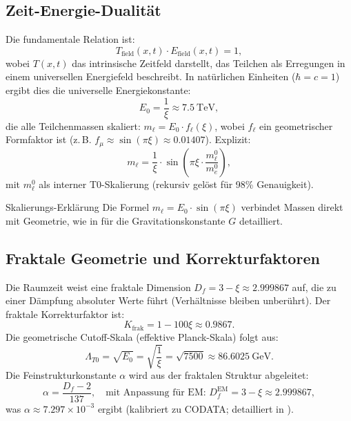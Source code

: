 \documentclass[12pt,a4paper]{article}
\begin{document}
	\subsection{Zeit-Energie-Dualität}
	Die fundamentale Relation ist:
	\begin{equation}
		T_\text{field}(x,t) \cdot E_\text{field}(x,t) = 1,
	\end{equation}
	wobei $T(x,t)$ das intrinsische Zeitfeld darstellt, das Teilchen als Erregungen in einem universellen Energiefeld beschreibt. In natürlichen Einheiten ($\hbar = c = 1$) ergibt dies die universelle Energiekonstante:
	\begin{equation}
		E_0 = \frac{1}{\xi} \approx \SI{7.5}{\tera\electronvolt},
	\end{equation}
	die alle Teilchenmassen skaliert: $m_\ell = E_0 \cdot f_\ell(\xi)$, wobei $f_\ell$ ein geometrischer Formfaktor ist (z.\,B. $f_\mu \approx \sin(\pi \xi) \approx 0.01407$). Explizit:
	\begin{equation}
		m_\ell = \frac{1}{\xi} \cdot \sin\left(\pi \xi \cdot \frac{m_\ell^0}{m_e^0}\right),
	\end{equation}
	mit $m_\ell^0$ als interner T0-Skalierung (rekursiv gelöst für 98\% Genauigkeit).
	
	\begin{explanation}{Skalierungs-Erklärung}
		Die Formel $m_\ell = E_0 \cdot \sin(\pi \xi)$ verbindet Massen direkt mit Geometrie, wie in \cite{T0_Gravitationskonstante} für die Gravitationskonstante $G$ detailliert.
	\end{explanation}
	
	\subsection{Fraktale Geometrie und Korrekturfaktoren}
	Die Raumzeit weist eine fraktale Dimension $D_f = 3 - \xi \approx 2.999867$ auf, die zu einer Dämpfung absoluter Werte führt (Verhältnisse bleiben unberührt). Der fraktale Korrekturfaktor ist:
	\begin{equation}
		K_\text{frak} = 1 - 100 \xi \approx 0.9867.
	\end{equation}
	Die geometrische Cutoff-Skala (effektive Planck-Skala) folgt aus:
	\begin{equation}
		\Lambda_{T0} = \sqrt{E_0} = \sqrt{\frac{1}{\xi}} = \sqrt{7500} \approx \SI{86.6025}{\giga\electronvolt}.
	\end{equation}
	Die Feinstrukturkonstante $\alpha$ wird aus der fraktalen Struktur abgeleitet:
	\begin{equation}
		\alpha = \frac{D_f - 2}{137}, \quad \text{mit Anpassung für EM: } D_f^\text{EM} = 3 - \xi \approx 2.999867,
	\end{equation}
	was $\alpha \approx 7.297 \times 10^{-3}$ ergibt (kalibriert zu CODATA; detailliert in \cite{T0_FineStructure}).
	
\end{document}
